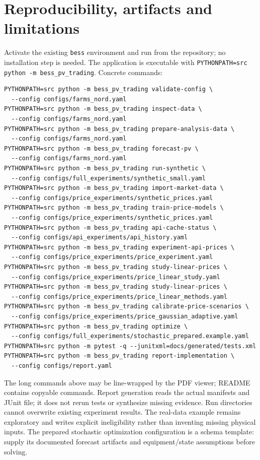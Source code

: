 \documentclass[11pt,a4paper]{article}
\begin{document}
\section{Reproducibility, artifacts and limitations}
Activate the existing \texttt{bess} environment and run from the repository;
no installation step is needed. The application is executable with
\texttt{PYTHONPATH=src python -m bess\_pv\_trading}. Concrete commands:
\begin{verbatim}
PYTHONPATH=src python -m bess_pv_trading validate-config \
  --config configs/farms_nord.yaml
PYTHONPATH=src python -m bess_pv_trading inspect-data \
  --config configs/farms_nord.yaml
PYTHONPATH=src python -m bess_pv_trading prepare-analysis-data \
  --config configs/farms_nord.yaml
PYTHONPATH=src python -m bess_pv_trading forecast-pv \
  --config configs/farms_nord.yaml
PYTHONPATH=src python -m bess_pv_trading run-synthetic \
  --config configs/full_experiments/synthetic_small.yaml
PYTHONPATH=src python -m bess_pv_trading import-market-data \
  --config configs/price_experiments/synthetic_prices.yaml
PYTHONPATH=src python -m bess_pv_trading train-price-models \
  --config configs/price_experiments/synthetic_prices.yaml
PYTHONPATH=src python -m bess_pv_trading api-cache-status \
  --config configs/api_experiments/api_history.yaml
PYTHONPATH=src python -m bess_pv_trading experiment-api-prices \
  --config configs/price_experiments/price_experiment.yaml
PYTHONPATH=src python -m bess_pv_trading study-linear-prices \
  --config configs/price_experiments/price_linear_study.yaml
PYTHONPATH=src python -m bess_pv_trading study-linear-prices \
  --config configs/price_experiments/price_linear_methods.yaml
PYTHONPATH=src python -m bess_pv_trading calibrate-price-scenarios \
  --config configs/price_experiments/price_gaussian_adaptive.yaml
PYTHONPATH=src python -m bess_pv_trading optimize \
  --config configs/full_experiments/stochastic_prepared.example.yaml
PYTHONPATH=src python -m pytest -q --junitxml=docs/generated/tests.xml
PYTHONPATH=src python -m bess_pv_trading report-implementation \
  --config configs/report.yaml
\end{verbatim}
The long commands above may be line-wrapped by the PDF viewer; README contains
copyable commands. Report generation reads the actual manifests and JUnit file;
it does not rerun tests or synthesize missing evidence. Run directories cannot
overwrite existing experiment results. The real-data example remains exploratory
and writes explicit ineligibility rather than inventing missing physical inputs.
The prepared stochastic optimization configuration is a schema template: supply
its documented forecast artifacts and equipment/state assumptions before solving.
\end{document}
